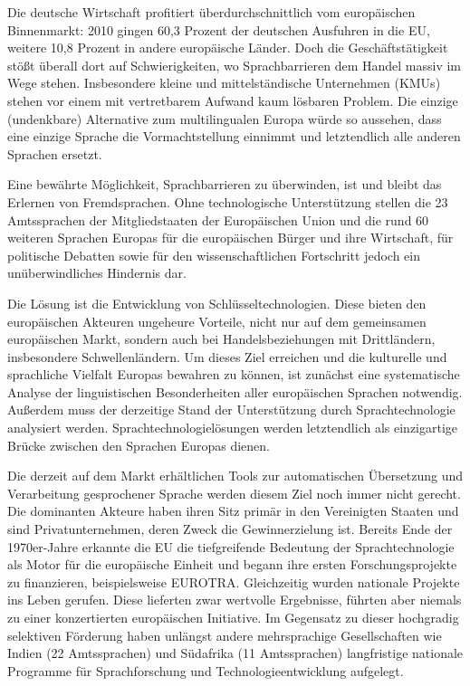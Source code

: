 \documentclass[]{../../metanetpaper}
\begin{document}
\begin{Parallel}[c]{80mm}{80mm}
{Die deutsche Wirtschaft profitiert überdurchschnittlich vom europäischen Binnenmarkt: 2010 gingen 60,3 Prozent der deutschen Ausfuhren in die EU, weitere 10,8 Prozent in andere europäische Länder. Doch die Geschäftstätigkeit stößt überall dort auf Schwierigkeiten, wo Sprachbarrieren dem Handel massiv im Wege stehen. Insbesondere kleine und mittelständische Unternehmen (KMUs) stehen vor einem mit vertretbarem Aufwand kaum lösbaren Problem. Die einzige (undenkbare) Alternative zum multilingualen Europa würde so aussehen, dass eine einzige Sprache die Vormachtstellung einnimmt und letztendlich alle anderen Sprachen ersetzt. 

Eine bewährte Möglichkeit, Sprachbarrieren zu überwinden, ist und bleibt das Erlernen von Fremdsprachen. Ohne technologische Unterstützung stellen die 23 Amtssprachen der Mitgliedstaaten der Europäischen Union und die rund 60 weiteren Sprachen Europas für die europäischen Bürger und ihre Wirtschaft, für politische Debatten sowie für den wissenschaftlichen Fortschritt jedoch ein unüberwindliches Hindernis dar. 

Die Lösung ist die Entwicklung von Schlüsseltechnologien. Diese bieten den europäischen Akteuren ungeheure Vorteile, nicht nur auf dem gemeinsamen europäischen Markt, sondern auch bei Handelsbeziehungen mit Drittländern, insbesondere Schwellenländern. Um dieses Ziel erreichen und die kulturelle und sprachliche Vielfalt Europas bewahren zu können, ist zunächst eine systematische Analyse der linguistischen Besonderheiten aller europäischen Sprachen notwendig. Außerdem muss der derzeitige Stand der Unterstützung durch Sprachtechnologie analysiert werden. Sprachtechnologielösungen werden letztendlich als einzigartige Brücke zwischen den Sprachen Europas dienen.
    
    
Die derzeit auf dem Markt erhältlichen Tools zur automatischen Übersetzung und Verarbeitung gesprochener Sprache werden diesem Ziel noch immer nicht gerecht. Die dominanten Akteure haben ihren Sitz primär in den Vereinigten Staaten und sind Privatunternehmen, deren Zweck die Gewinnerzielung ist. Bereits Ende der 1970er-Jahre erkannte die EU die tiefgreifende Bedeutung der Sprachtechnologie als Motor für die europäische Einheit und begann ihre ersten Forschungsprojekte zu finanzieren, beispielsweise EUROTRA. Gleichzeitig wurden nationale Projekte ins Leben gerufen. Diese lieferten zwar wertvolle Ergebnisse, führten aber niemals zu einer konzertierten europäischen Initiative. Im Gegensatz zu dieser hochgradig selektiven Förderung haben unlängst andere mehrsprachige Gesellschaften wie Indien (22 Amtssprachen) und Südafrika (11 Amtssprachen) langfristige nationale Programme für Sprachforschung und Technologieentwicklung aufgelegt. 

}
\end{Parallel}
\end{document}
